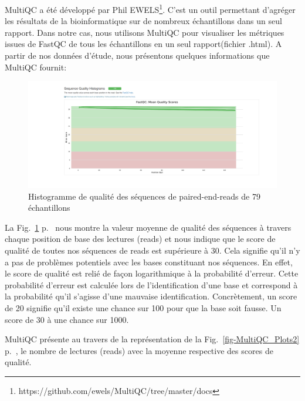 \documentclass[a4paper,11pt]{article}
\begin{document}
\newpage

MultiQC a été développé par Phil
EWELS\footnote{{https://github.com/ewels/MultiQC/tree/master/docs}}. C'est
un outil permettant d’agréger les résultats de la bioinformatique sur
de nombreux échantillons dans un seul rapport. Dans notre cas, nous
utilisons MultiQC pour visualiser les métriques issues de FastQC de
tous les échantillons en un seul rapport(fichier .html).  A partir de
nos données d'étude, nous présentons quelques informations que MultiQC
fournit:

\begin{figure}
  \begin{center}
    \includegraphics[width=16cm]{Images/MultiQC_Plots1}
  \end{center}
  \caption{Histogramme de qualité des séquences de
    \og{}paired-end-reads\fg{} de 79 échantillons}
  \label{fig-MultiQC_Plots1}
\end{figure}

La Fig.~\ref{fig-MultiQC_Plots1} p.~\pageref{fig-MultiQC_Plots1} nous
montre la valeur moyenne de qualité des séquences à travers chaque
position de base des lectures (reads) et nous indique que le score de
qualité de toutes nos séquences de reads est supérieure à 30. Cela
signifie qu'il n'y a pas de problèmes potentiels avec les bases
constituant nos séquences. En effet, le score de qualité est relié de
façon logarithmique à la probabilité d'erreur. Cette probabilité
d'erreur est calculée lors de l'identification d'une base et
correspond à la probabilité qu'il s'agisse d'une mauvaise
identification. Concrètement, un score de 20 signifie qu'il existe une
chance sur 100 pour que la base soit fausse. Un score de 30 à une
chance sur 1000.

MultiQC présente au travers de la représentation de la
Fig.~\ref{fig-MultiQC_Plots2} p.~\pageref{fig-MultiQC_Plots2}, le
nombre de lectures (reads) avec la moyenne respective des scores de
qualité.
\end{document}
